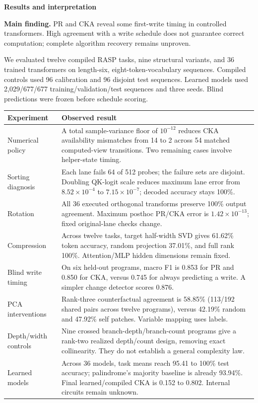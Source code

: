 \documentclass[10pt,a4paper]{article}
\newcommand{\heading}[1]{\par\vspace{3pt}{\sffamily\bfseries\color{navy}#1}\par}
\begin{document}
{\sffamily\large\bfseries\color{navy}Results and interpretation}\par
\textbf{Main finding.} PR and CKA reveal some first-write timing in controlled transformers. High agreement with a write schedule does not guarantee correct computation; complete algorithm recovery remains unproven.

\heading{Methods in brief}
We evaluated twelve compiled RASP tasks, nine structural variants, and 36 trained transformers on length-six, eight-token-vocabulary sequences. Compiled controls used 96 calibration and 96 disjoint test sequences. Learned models used 2,029/677/677 training/validation/test sequences and three seeds. Blind predictions were frozen before schedule scoring.

\begingroup\small
\begin{tabularx}{\linewidth}{@{}>{\raggedright\arraybackslash}p{.18\linewidth}X@{}}
\toprule
\textbf{Experiment} & \textbf{Observed result}\\
\midrule
Numerical policy & A total sample-variance floor of $10^{-12}$ reduces CKA availability mismatches from 14 to 2 across 54 matched computed-view transitions. Two remaining cases involve helper-state timing.\\
Sorting diagnosis & Each lane fails 64 of 512 probes; the failure sets are disjoint. Doubling QK-logit scale reduces maximum lane error from $8.52\times10^{-4}$ to $7.15\times10^{-7}$; decoded accuracy stays 100\%.\\
Rotation & All 36 executed orthogonal transforms preserve 100\% output agreement. Maximum posthoc PR/CKA error is $1.42\times10^{-13}$; fixed original-lane checks change.\\
Compression & Across twelve tasks, target half-width SVD gives 61.62\% token accuracy, random projection 37.01\%, and full rank 100\%. Attention/MLP hidden dimensions remain fixed.\\
Blind write timing & On six held-out programs, macro F1 is 0.853 for PR and 0.850 for CKA, versus 0.745 for always predicting a write. A simpler change detector scores 0.876.\\
PCA interventions & Rank-three counterfactual agreement is 58.85\% (113/192 shared pairs across twelve programs), versus 42.19\% random and 47.92\% self patches. Variable mapping uses labels.\\
Depth/width controls & Nine crossed branch-depth/branch-count programs give a rank-two realized depth/count design, removing exact collinearity. They do not establish a general complexity law.\\
Learned models & Across 36 models, task means reach 95.41 to 100\% test accuracy; palindrome's majority baseline is already 93.94\%. Final learned/compiled CKA is 0.152 to 0.802. Internal circuits remain unknown.\\
\bottomrule
\end{tabularx}
\endgroup
\end{document}
